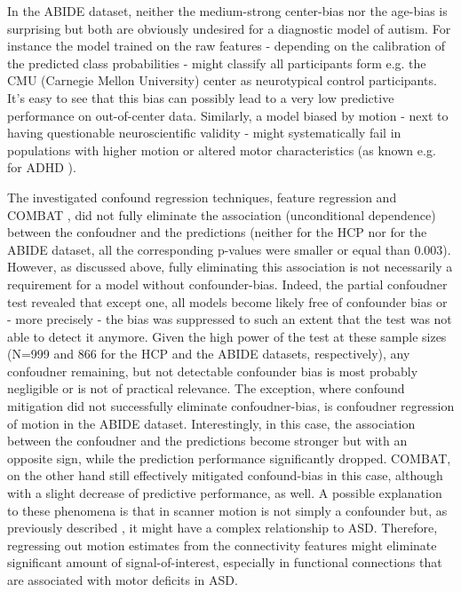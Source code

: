 \documentclass{article}
\begin{document}
In the ABIDE dataset, neither the medium-strong center-bias nor the age-bias is surprising but both are obviously undesired for a diagnostic model of autism. For instance the model trained on the raw features - depending on the calibration of the predicted class probabilities - might classify all participants form e.g. the CMU (Carnegie Mellon University) center as neurotypical control participants. It's easy to see that this bias can possibly lead to a very low predictive performance on out-of-center data. Similarly, a model biased by motion - next to having questionable neuroscientific validity - might systematically fail in populations with higher motion or altered motor characteristics (as known e.g. for ADHD \cite{eloyan2012automated}).

The investigated confound regression techniques, feature regression  \citep{spisak2014voxel, dukart2011age, abdulkadir2014reduction, rao2017predictive} and COMBAT \citep{johnson2007adjusting}, did not fully eliminate the association (unconditional dependence) between the confoudner and the predictions (neither for the HCP nor for the ABIDE dataset, all the corresponding p-values were smaller or equal than 0.003). However, as discussed above, fully eliminating this association is not necessarily a requirement for a model without confounder-bias. Indeed, the partial confoudner test revealed that except one, all models become likely free of confounder bias or - more precisely - the bias was suppressed to such an extent that the test was not able to detect it anymore. Given the high power of the test at these sample sizes (N=999 and 866 for the HCP and the ABIDE datasets, respectively), any confoudner remaining, but not detectable confounder bias is most probably negligible or is not of practical relevance.
The exception, where confound mitigation did not successfully eliminate confoudner-bias, is confoudner regression of motion in the ABIDE dataset. Interestingly, in this case, the association between the confoudner and the predictions become stronger but with an opposite sign, while the prediction performance significantly dropped. COMBAT, on the other hand still effectively mitigated confound-bias in this case, although with a slight decrease of predictive performance, as well. A possible explanation to these phenomena is that in scanner motion is not simply a confounder but, as previously described \citep{fournier2010motor, anzulewicz2016toward}, it might have a complex relationship to ASD. Therefore, regressing out motion estimates from the connectivity features might eliminate significant amount of signal-of-interest, especially in functional connections that are associated with motor deficits in ASD. 
\end{document}
